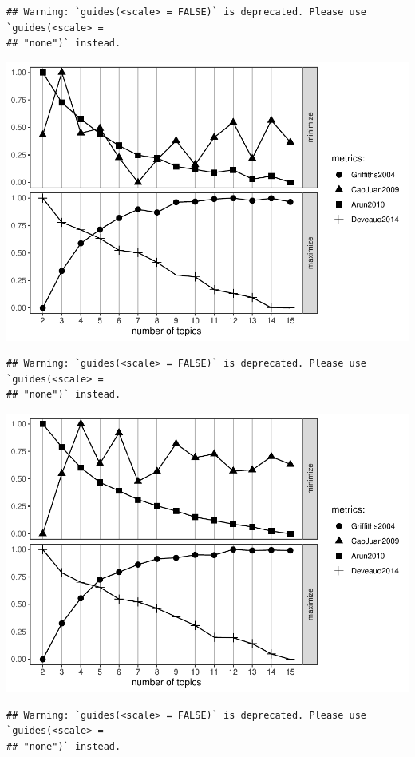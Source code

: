 \documentclass[]{elsarticle} %
\begin{document}
\begin{verbatim}
## Warning: `guides(<scale> = FALSE)` is deprecated. Please use `guides(<scale> =
## "none")` instead.
\end{verbatim}

\includegraphics{AST-Framing-Ontario_files/figure-latex/evaluate-lda-3.pdf}

\begin{verbatim}
## Warning: `guides(<scale> = FALSE)` is deprecated. Please use `guides(<scale> =
## "none")` instead.
\end{verbatim}

\includegraphics{AST-Framing-Ontario_files/figure-latex/evaluate-lda-4.pdf}

\begin{verbatim}
## Warning: `guides(<scale> = FALSE)` is deprecated. Please use `guides(<scale> =
## "none")` instead.
\end{verbatim}
\end{document}
